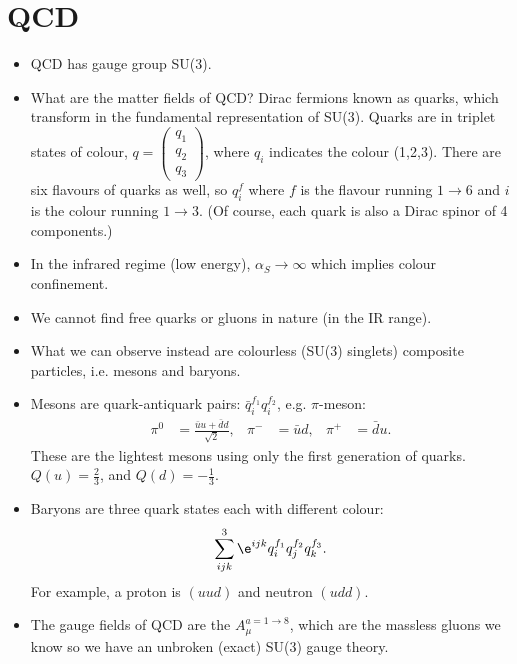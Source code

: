 \documentclass[a4paper, 11pt, normalem]{report}
\begin{document}
\section{QCD}
\begin{itemize}
    \item QCD has gauge group SU(3).
    \item What are the matter fields of QCD? Dirac fermions known as quarks, which transform in the fundamental representation of SU(3).
        Quarks are in triplet states of colour, $q=\begin{pmatrix}q_1\\q_2\\q_3\end{pmatrix}$, where $q_i$ indicates the colour (1,2,3).
        There are six flavours of quarks as well, so $q^f_i$ where $f$ is the flavour running $1\to6$ and $i$ is the colour running $1\to3$.
        (Of course, each quark is also a Dirac spinor of 4 components.)
    \item In the infrared regime (low energy), $\alpha_S\to\infty$ which implies colour confinement.
    \item We cannot find free quarks or gluons in nature (in the IR range).
    \item What we can observe instead are colourless (SU(3) singlets) composite particles, i.e. mesons and baryons.
    \item Mesons are quark-antiquark pairs: $\bar{q}_i^{f_1}q_i^{f_2}$, e.g. $\pi$-meson:
        \begin{align}
            \pi^0 &= \frac{\bar{u}u + \bar{d}d}{\sqrt{2}}, &
            \pi^- &= \bar{u}d, &
            \pi^+ &= \bar{d}u.
        \end{align}
        These are the lightest mesons using only the first generation of quarks.
        $Q(u) = \frac23$, and $Q(d)=-\frac13$.
    \item Baryons are three quark states each with different colour:
        \begin{align}
            \sum_{ijk}^3 \e^{ijk}q^{f_1}_iq^{f_2}_jq^{f_3}_k.
        \end{align}
        For example, a proton is $(uud)$ and neutron $(udd)$.
    \item The gauge fields of QCD are the $A_\mu^{a=1\to8}$, which are the massless gluons we know so we have an unbroken (exact) SU(3) gauge theory.
\end{itemize}
\end{document}
